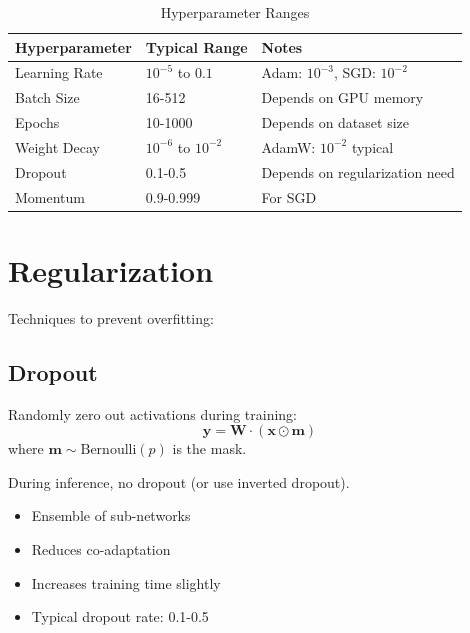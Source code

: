 \begin{table}[h]
    \centering
    \caption{Hyperparameter Ranges}
    \begin{tabular}{L{2.5cm} L{3cm} L{3.5cm}}
        \toprule
        \textbf{Hyperparameter} & \textbf{Typical Range} & \textbf{Notes} \\
        \midrule
        Learning Rate & $10^{-5}$ to $0.1$ & Adam: $10^{-3}$, SGD: $10^{-2}$ \\
        Batch Size & 16-512 & Depends on GPU memory \\
        Epochs & 10-1000 & Depends on dataset size \\
        Weight Decay & $10^{-6}$ to $10^{-2}$ & AdamW: $10^{-2}$ typical \\
        Dropout & 0.1-0.5 & Depends on regularization need \\
        Momentum & 0.9-0.999 & For SGD \\
        \bottomrule
    \end{tabular}
\end{table}

\section{Regularization}

Techniques to prevent overfitting:

\subsection{Dropout}

Randomly zero out activations during training:
\begin{equation}
\mathbf{y} = \mathbf{W} \cdot (\mathbf{x} \odot \mathbf{m})
\end{equation}
where $\mathbf{m} \sim \text{Bernoulli}(p)$ is the mask.

During inference, no dropout (or use inverted dropout).

\begin{properties}
\begin{itemize}
    \item Ensemble of sub-networks
    \item Reduces co-adaptation
    \item Increases training time slightly
    \item Typical dropout rate: 0.1-0.5
\end{itemize}
\end{properties}

